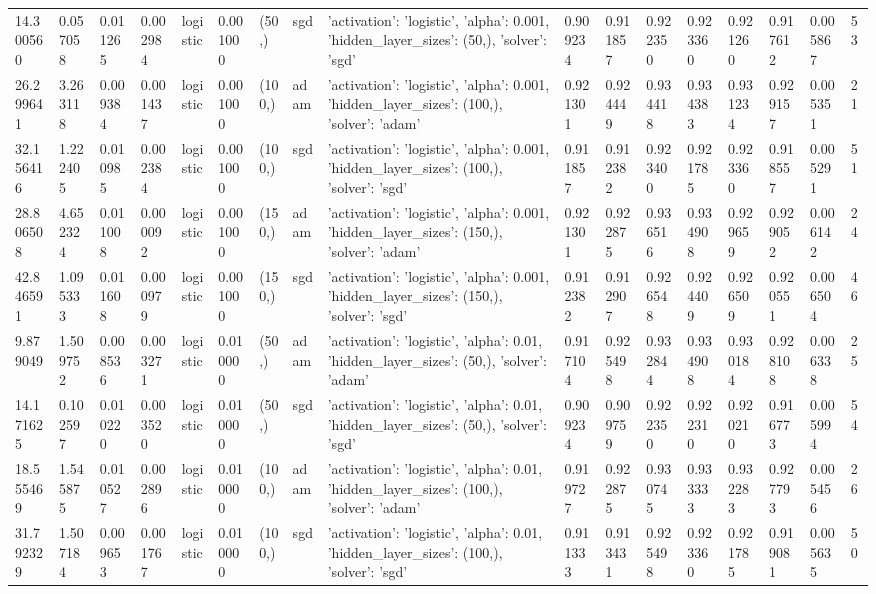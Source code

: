 \documentclass[a1paper]{article}  %
\begin{document}
\begin{landscape}
\begin{tabular}{lllllllllllllllll}
		14.300560 & 0.057058 & 0.011265 & 0.002984 & logistic & 0.001000 & (50,) & sgd & {'activation': 'logistic', 'alpha': 0.001, 'hidden\_layer\_sizes': (50,), 'solver': 'sgd'} & 0.909234 & 0.911857 & 0.922350 & 0.923360 & 0.921260 & 0.917612 & 0.005867 & 53 \\
		26.299641 & 3.263118 & 0.009384 & 0.001437 & logistic & 0.001000 & (100,) & adam & {'activation': 'logistic', 'alpha': 0.001, 'hidden\_layer\_sizes': (100,), 'solver': 'adam'} & 0.921301 & 0.924449 & 0.934418 & 0.934383 & 0.931234 & 0.929157 & 0.005351 & 21 \\
		32.156416 & 1.222405 & 0.010985 & 0.002384 & logistic & 0.001000 & (100,) & sgd & {'activation': 'logistic', 'alpha': 0.001, 'hidden\_layer\_sizes': (100,), 'solver': 'sgd'} & 0.911857 & 0.912382 & 0.923400 & 0.921785 & 0.923360 & 0.918557 & 0.005291 & 51 \\
		28.806508 & 4.652324 & 0.011008 & 0.000092 & logistic & 0.001000 & (150,) & adam & {'activation': 'logistic', 'alpha': 0.001, 'hidden\_layer\_sizes': (150,), 'solver': 'adam'} & 0.921301 & 0.922875 & 0.936516 & 0.934908 & 0.929659 & 0.929052 & 0.006142 & 24 \\
		42.846591 & 1.095333 & 0.011608 & 0.000979 & logistic & 0.001000 & (150,) & sgd & {'activation': 'logistic', 'alpha': 0.001, 'hidden\_layer\_sizes': (150,), 'solver': 'sgd'} & 0.912382 & 0.912907 & 0.926548 & 0.924409 & 0.926509 & 0.920551 & 0.006504 & 46 \\
		9.879049 & 1.509752 & 0.008536 & 0.003271 & logistic & 0.010000 & (50,) & adam & {'activation': 'logistic', 'alpha': 0.01, 'hidden\_layer\_sizes': (50,), 'solver': 'adam'} & 0.917104 & 0.925498 & 0.932844 & 0.934908 & 0.930184 & 0.928108 & 0.006338 & 25 \\
		14.171625 & 0.102597 & 0.010220 & 0.003520 & logistic & 0.010000 & (50,) & sgd & {'activation': 'logistic', 'alpha': 0.01, 'hidden\_layer\_sizes': (50,), 'solver': 'sgd'} & 0.909234 & 0.909759 & 0.922350 & 0.922310 & 0.920210 & 0.916773 & 0.005994 & 54 \\
		18.555469 & 1.545875 & 0.010527 & 0.002896 & logistic & 0.010000 & (100,) & adam & {'activation': 'logistic', 'alpha': 0.01, 'hidden\_layer\_sizes': (100,), 'solver': 'adam'} & 0.919727 & 0.922875 & 0.930745 & 0.933333 & 0.932283 & 0.927793 & 0.005456 & 26 \\
		31.792329 & 1.507184 & 0.009653 & 0.001767 & logistic & 0.010000 & (100,) & sgd & {'activation': 'logistic', 'alpha': 0.01, 'hidden\_layer\_sizes': (100,), 'solver': 'sgd'} & 0.911333 & 0.913431 & 0.925498 & 0.923360 & 0.921785 & 0.919081 & 0.005635 & 50 \\

\end{tabular}
\end{landscape}
\end{document}
